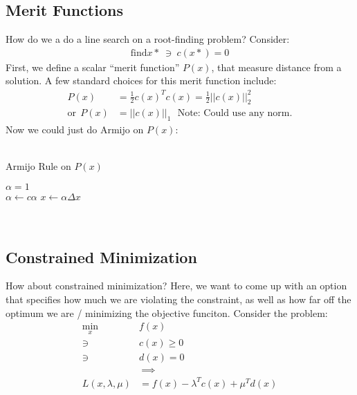 \subsection{Merit Functions}
How do we a do a line search on a root-finding problem? Consider:
\begin{align}
    \textrm{find} x* \ \ni \ c(x*) = 0
\end{align}
First, we define  a scalar ``merit function'' $P(x)$, that measure distance from a solution.
A few standard choices for this merit function include:
\begin{align}
    P(x) &= \frac{1}{2} c(x)^T c(x) = \frac{1}{2} || c(x) ||_{2}^2 \\
    \textrm{or} \ \ P(x) &= || c(x) ||_{1} \ \ \ \textrm{Note: Could use any norm}.
\end{align}
Now we could just do Armijo on $P(x)$:
\\
\\
\noindent
\begin{algorithm}
	\caption{Armijo Rule on $P(x)$}
	\label{alg:armijo2}
	\begin{algorithmic}[1]
        \State $\alpha = 1$  
         \\ 
            \State $\alpha \gets c \alpha$ 
        \EndWhile
        \State $x \gets \alpha \Delta x$
	\end{algorithmic}
\end{algorithm}
\\

\subsection{Constrained Minimization}
\noindent
How about constrained minimization? Here, we want to come up with an option that specifies how much we are violating the constraint, as well as how far off the optimum we are / minimizing the objective funciton. Consider the problem:
\begin{align}
    \min_x &f(x) \\
    \ni \ \ &c(x) \geq 0 \\
    \ni \ \ &d(x) = 0 \\
    \ &\ \implies \\
    L(x, \lambda, \mu) &= f(x) - \lambda^T c(x) + \mu^T d(x)
\end{align} \\

